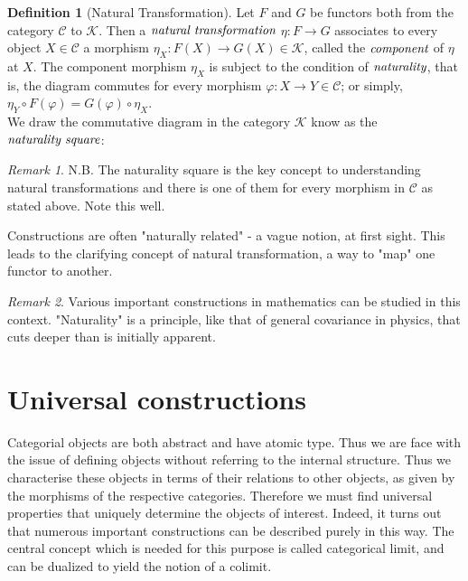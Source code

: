 \documentclass[10pt, oneside, reqno]{amsart}
\theoremstyle{plain}%
\theoremstyle{definition}
\newtheorem{defn}[thm]{Definition}
\theoremstyle{remark}
\newtheorem*{rem}{Remark}
\begin{document}
\begin{defn}[Natural Transformation]
 Let $F$ and $G$ be functors both from the category $\mathcal{C}$ to $\mathcal{K}$.
 Then a $\emph{natural transformation}$ $\eta : F \to G$ associates to every object
 $X \in \mathcal{C}$ a morphism $\eta_{X} : F(X) \to G(X) \in \mathcal{K}$, called the $\emph{component}$
 of $\eta$ at $X$. The component morphism $\eta_{X}$ is subject to the condition of $\emph{naturality}$,
 that is, the diagram commutes for every morphism $\varphi: X \to Y \in \mathcal{C}$; or simply,
 $\eta_{Y} \circ F(\varphi) = G(\varphi) \circ \eta_{X}$.
 \\
 We draw the commutative diagram in the category $\mathcal{K}$ know as the $\emph{naturality square}$:
\end{defn}
\begin{rem}
 N.B. The naturality square is the key concept to understanding natural transformations and
 there is one of them for every morphism in $\mathcal{C}$ as stated above. Note this well.
\end{rem}

Constructions are often "naturally related" - a vague notion, at first sight.
This leads to the clarifying concept of natural transformation, a way to "map" one functor to another.
\begin{rem}
 Various important constructions in mathematics can be studied in this context.
 "Naturality" is a principle, like that of general covariance in physics, that cuts deeper than is initially apparent.
\end{rem}


\section{Universal constructions} %
\label{sec:universalconstructions}
Categorial objects are both abstract and have atomic type.
Thus we are face with the issue of defining objects without referring to the internal structure.
Thus we characterise these objects in terms of their relations to other objects, as given by the morphisms 
of the respective categories. Therefore we must find universal properties that uniquely determine the objects of interest.
Indeed, it turns out that numerous important constructions can be described purely in this way.
The central concept which is needed for this purpose is called categorical limit, and can be dualized to yield the notion of a colimit.
\end{document}
